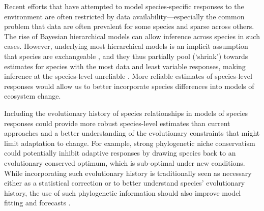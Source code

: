 \documentclass[11pt]{article}
\begin{document}
Recent efforts that have attempted to model species-specific responses to the environment \citep{diez2012forecasting} are often restricted by data availability---especially the common problem that data are often prevalent for some species and sparse across others. The rise of Bayesian hierarchical models can allow inference across species in such cases. However, underlying most hierarchical models is an implicit assumption that species are exchangeable \citep{gelman2006}, and they thus partially pool (`shrink') towards estimates for species with the most data and least variable responses, making inference at the species-level unreliable \citep{ettinger2020}. More reliable estimates of species-level responses would allow us to better incorporate species differences into models of ecosystem change. 

Including the evolutionary history of species relationships in models of species responses could provide more robust species-level estimates than current approaches and a better understanding of the evolutionary constraints that might limit adaptation to change. For example, strong phylogenetic niche conservatism \citep{wiens2010niche} could potentially inhibit adaptive responses by drawing species back to an evolutionary conserved optimum, which is sub-optimal under new conditions. %
While incorporating such evolutionary history is traditionally seen as necessary either as a statistical correction or to better understand species' evolutionary history, the use of such phylogenetic information should also improve model fitting and forecasts \citep{freckleton2002phylogenetic}.



 
\end{document}
